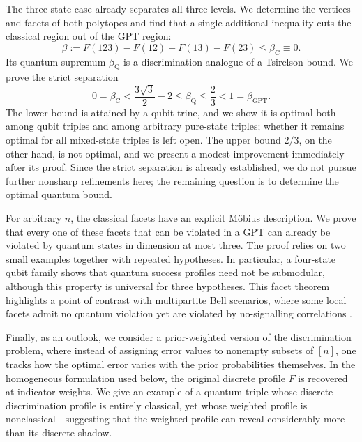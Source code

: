 \documentclass[a4paper,11pt,onecolumn,unpublished]{quantumarticle}
\theoremstyle{definition}
\newcommand{\1}{\mathbf 1}
\begin{document}
The three-state case already separates all three levels. We determine the
vertices and facets of both polytopes and find that a single additional
inequality cuts the classical region out of the GPT region:
\begin{equation}\label{eq:intro-beta}
 \beta:=F(123)-F(12)-F(13)-F(23)\le\beta_{\mathrm C}\equiv0.
\end{equation}
Its quantum supremum $\beta_{\mathrm Q}$ is a discrimination analogue of a
Tsirelson bound. We prove the strict separation
\begin{equation}\label{eq:intro-bounds}
 0=\beta_{\mathrm C}
 <\frac{3\sqrt3}{2}-2
 \le\beta_{\mathrm Q}\le\frac23
 <1=\beta_{\mathrm{GPT}}.
\end{equation}
The lower bound is attained by a qubit trine, and we show it is optimal both
among qubit triples and among arbitrary pure-state triples; whether it remains
optimal for all mixed-state triples is left open. The upper bound $2/3$, on the
other hand, is not optimal, and we present a modest improvement immediately
after its proof. Since the strict separation is already established, we do
not pursue further nonsharp refinements here; the remaining question is to
determine the optimal quantum bound.

For arbitrary $n$, the classical facets have an explicit M\"obius description.
We prove that every one of these facets that can be violated in a GPT can
already be violated by quantum states in dimension at most three. The proof
relies on two small examples together with repeated hypotheses. In particular,
a four-state qubit family shows that quantum success profiles need not be
submodular, although this property is universal for three hypotheses. This
facet theorem highlights a point of contrast with multipartite Bell scenarios,
where some local facets admit no quantum violation yet are violated by
no-signalling correlations \cite{AlmeidaEtAl2010}.

Finally, as an outlook, we consider a prior-weighted version of the
discrimination problem, where instead of assigning error values to nonempty
subsets of $[n]$, one tracks how the optimal error varies with the prior
probabilities themselves. In the homogeneous formulation used below, the
original discrete profile $F$ is recovered at indicator weights. We give an
example of a quantum triple whose discrete discrimination profile is entirely
classical, yet whose weighted profile is nonclassical---suggesting that the
weighted profile can reveal considerably more than its discrete shadow.
\end{document}
